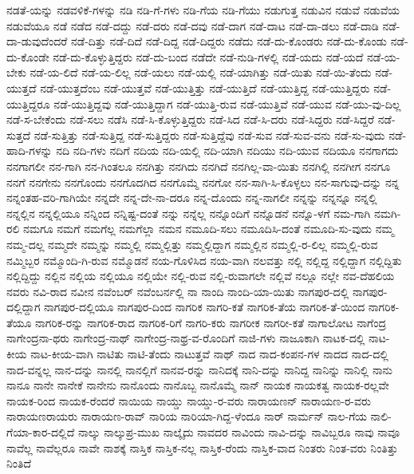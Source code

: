 {ನಡತೆ-ಯನ್ನು
ನಡವಳಿಕೆ-ಗಳನ್ನು
ನಡಿ
ನಡಿ-ಗೆ-ಗಳು
ನಡಿ-ಗೆಯ
ನಡಿ-ಗೆಯು
ನಡುಗುತ್ತ
ನಡುವಿನ
ನಡುವೆ
ನಡುವೆಯ
ನಡುವೆಯೂ
ನಡೆ
ನಡೆದ
ನಡೆ-ದದ್ದು
ನಡೆ-ದರು
ನಡೆ-ದವು
ನಡೆ-ದಾಗ
ನಡೆ-ದಾಟ
ನಡೆ-ದಾ-ಡಲು
ನಡೆ-ದಾಡಿ
ನಡೆ-ದಾ-ಡುವುದೆಂದರೆ
ನಡೆ-ದಿತ್ತು
ನಡೆ-ದಿದೆ
ನಡೆ-ದಿದ್ದ
ನಡೆ-ದಿದ್ದರು
ನಡೆದು
ನಡೆ-ದು-ಕೊಂಡರು
ನಡೆ-ದು-ಕೊಂಡು
ನಡೆ-ದು-ಕೊಂಡೇ
ನಡೆ-ದು-ಕೊಳ್ಳುತ್ತಿದ್ದರು
ನಡೆ-ದು-ಬಂದ
ನಡೆದೇ
ನಡೆ-ನುಡಿ-ಗಳಲ್ಲಿ
ನಡೆ-ಯದು
ನಡೆ-ಯದೆ
ನಡೆ-ಯ-ಬೇಕು
ನಡೆ-ಯ-ಲಿದೆ
ನಡೆ-ಯ-ಲಿಲ್ಲ
ನಡೆ-ಯಲು
ನಡೆ-ಯಲ್ಲಿ
ನಡೆ-ಯಾಗಿತ್ತು
ನಡೆ-ಯಿತು
ನಡೆ-ಯಿ-ತೆಂದು
ನಡೆ-ಯುತ್ತದೆ
ನಡೆ-ಯುತ್ತದೆಂಬ
ನಡೆ-ಯುತ್ತವೆ
ನಡೆ-ಯುತ್ತಿತ್ತು
ನಡೆ-ಯುತ್ತಿದೆ
ನಡೆ-ಯುತ್ತಿದ್ದ
ನಡೆ-ಯುತ್ತಿದ್ದರು
ನಡೆ-ಯುತ್ತಿದ್ದರೂ
ನಡೆ-ಯುತ್ತಿದ್ದವು
ನಡೆ-ಯುತ್ತಿದ್ದಾಗ
ನಡೆ-ಯುತ್ತಿ-ರುವ
ನಡೆ-ಯುತ್ತಿವೆ
ನಡೆ-ಯುವ
ನಡೆ-ಯು-ವು-ದಿಲ್ಲ
ನಡೆ-ಸ-ಬೇಕೆಂದು
ನಡೆ-ಸಲು
ನಡೆಸಿ
ನಡೆ-ಸಿ-ಕೊಳ್ಳುತ್ತಿದ್ದರು
ನಡೆ-ಸಿದ
ನಡೆ-ಸಿ-ದರು
ನಡೆ-ಸಿದ್ದರು
ನಡೆ-ಸಿದ್ದರೆ
ನಡೆ-ಸುತ್ತದೆ
ನಡೆ-ಸುತ್ತಿತ್ತು
ನಡೆ-ಸುತ್ತಿದ್ದ
ನಡೆ-ಸುತ್ತಿದ್ದರು
ನಡೆ-ಸುತ್ತಿದ್ದೆವು
ನಡೆ-ಸುವ
ನಡೆ-ಸುವ-ವನು
ನಡೆ-ಸು-ವುದು
ನಡೆ-ಹಾದಿ-ಗಳನ್ನು
ನದಿ
ನದಿ-ಗಳು
ನದಿಗೆ
ನದಿಯ
ನದಿ-ಯಲ್ಲಿ
ನದಿ-ಯಾಗಿ
ನದಿಯು
ನದಿ-ಯುವ
ನದಿಯೂ
ನನಗಾಗದು
ನನಗಾಗಲೀ
ನನ-ಗಾಗಿ
ನನ-ಗಿಂತಲೂ
ನನಗಿತ್ತು
ನನಗಿದು
ನನಗಿದೆ
ನನಗಿಲ್ಲ-ವಾ-ಯಿತು
ನನಗಿಲ್ಲಿ
ನನಗೀಗ
ನನಗೂ
ನನಗೆ
ನನಗೇನು
ನನಗೊಂದು
ನನಗೊದಗಿದ
ನನಗೊಮ್ಮೆ
ನನಗೋ
ನನ-ಸಾಗಿ-ಸಿ-ಕೊಳ್ಳಲು
ನನ-ಸಾಗುವು-ದನ್ನು
ನನ್ನ
ನನ್ನಂತಹ-ವರಿ-ಗಾಗಿಯೇ
ನನ್ನದೇ
ನನ್ನ-ದೇ-ನಾ-ದರೂ
ನನ್ನ-ದೊಂದು
ನನ್ನ-ನಾಗಲೀ
ನನ್ನನ್ನು
ನನ್ನನ್ನೂ
ನನ್ನಲ್ಲಿ
ನನ್ನಲ್ಲಿನ
ನನ್ನಲ್ಲಿಯೂ
ನನ್ನಿಂದ
ನನ್ನಿಷ್ಟ-ದಂತೆ
ನನ್ನು
ನನ್ನೆಲ್ಲ
ನನ್ನೊಂದಿಗೆ
ನನ್ನೊಡನೆ
ನನ್ನೊ-ಳಗೆ
ನಮ-ಗಾಗಿ
ನಮಗಿ-ರಲಿ
ನಮಗೂ
ನಮಗೆ
ನಮಗೆಲ್ಲ
ನಮಗೆಲ್ಲಾ
ನಮನ
ನಮೂದಿ-ಸಲು
ನಮೂದಿಸಿ-ದಂತೆ
ನಮೂದಿ-ಸು-ವುದು
ನಮ್ಮ
ನಮ್ಮ-ದಲ್ಲ
ನಮ್ಮದೇ
ನಮ್ಮನ್ನು
ನಮ್ಮಲ್ಲಿ
ನಮ್ಮಲ್ಲಿತ್ತು
ನಮ್ಮಲ್ಲಿದ್ದಾಗ
ನಮ್ಮಲ್ಲಿನ
ನಮ್ಮಲ್ಲಿ-ರ-ಲಿಲ್ಲ
ನಮ್ಮಲ್ಲಿ-ರುವ
ನಮ್ಮಿಬ್ಬರ
ನಮ್ಮೊಂದಿ-ಗಿ-ರುವ
ನಮ್ಮೊಡನೆ
ನಯ-ಗೊಳಿಸಿದ
ನಯ-ವಾಗಿ
ನಲವತ್ತು
ನಲ್ಲಿ
ನಲ್ಲಿದ್ದ
ನಲ್ಲಿದ್ದಾಗ
ನಲ್ಲಿದ್ದಿತು
ನಲ್ಲಿದ್ದಿದ್ದು
ನಲ್ಲಿನ
ನಲ್ಲಿಯ
ನಲ್ಲಿಯೂ
ನಲ್ಲಿಯೇ
ನಲ್ಲಿ-ರುವ
ನಲ್ಲಿ-ರುವಾಗಲೇ
ನಲ್ಲಿವೆ
ನಲ್ಲೂ
ನಲ್ಲೇ
ನವ-ದೆಹಲಿಯ
ನವರು
ನವಿ-ರಾದ
ನವೀನ
ನವೆಂಬರ್
ನವೆಂಬರ್ನಲ್ಲಿ
ನಾ
ನಾಂದಿ
ನಾಂದಿ-ಯಾ-ಯಿತು
ನಾಗಪುರ-ದಲ್ಲಿ
ನಾಗಪುರ-ದಲ್ಲಿದ್ದಾಗ
ನಾಗಪುರ-ದಲ್ಲಿಯೂ
ನಾಗಪುರ-ದಿಂದ
ನಾಗರಿಕ
ನಾಗರಿ-ಕತೆ
ನಾಗರಿಕ-ತೆಯ
ನಾಗರಿಕ-ತೆ-ಯಿಂದ
ನಾಗರಿಕ-ತೆಯೂ
ನಾಗರಿಕ-ರನ್ನು
ನಾಗರಿಕ-ರಾದ
ನಾಗರಿಕ-ರಿಗೆ
ನಾಗರಿ-ಕರು
ನಾಗರೀಕ
ನಾಗರೀ-ಕತೆ
ನಾಗಾಲೋಟ
ನಾಗೆಂದ್ರ
ನಾಗೇಂದ್ರನಾ-ಥರು
ನಾಗೇಂದ್ರ-ನಾಥ್
ನಾಗೇಂದ್ರ-ನಾಥ್ರ-ವ-ರೊಂದಿಗೆ
ನಾಜಿ-ಗಳು
ನಾಜೂಕಾಗಿ
ನಾಟಕ-ದಲ್ಲಿ
ನಾಟ-ಕೀಯ
ನಾಟ-ಕೀಯ-ವಾಗಿ
ನಾಟಿತು
ನಾಟಿ-ತೆಂದು
ನಾಟುತ್ತವೆ
ನಾಥ್
ನಾದ
ನಾದ-ಕಂಪನ-ಗಳ
ನಾದದ
ನಾದ-ದಲ್ಲಿ
ನಾದ-ವನ್ನಲ್ಲ
ನಾನ-ದನ್ನು
ನಾನಲ್ಲಿ
ನಾನಲ್ಲಿಗೆ
ನಾನವ-ರನ್ನು
ನಾನಿದಕ್ಕೆ
ನಾನಿ-ದನ್ನು
ನಾನಿದ್ದ
ನಾನಿನ್ನು
ನಾನಿಲ್ಲಿ
ನಾನು
ನಾನೂ
ನಾನೇ
ನಾನೇಕೆ
ನಾನೇನು
ನಾನೊಂದು
ನಾನೊಬ್ಬ
ನಾನೊಮ್ಮೆ
ನಾನ್
ನಾಯಕ
ನಾಯಕತ್ವ
ನಾಯಕ-ರಲ್ಲವೇ
ನಾಯಕ-ರಿಂದ
ನಾಯಕ-ರೆಂದರೆ
ನಾಯಿಯ
ನಾಯ್ಡು
ನಾಯ್ಡು-ರ-ವರು
ನಾರಾಯಣನ್
ನಾರಾಯಣ-ರ-ವರು
ನಾರಾಯಣರಾಯರು
ನಾರಾಯಣ-ರಾವ್
ನಾರಿಯ
ನಾರಿಯಾ-ಗಿದ್ದ-ಳೆಂದೂ
ನಾರ್
ನಾರ್ಮನ್
ನಾಲ-ಗೆಯ
ನಾಲಿ-ಗೆಯಾ-ಕಾರ-ದಲ್ಲಿದೆ
ನಾಲ್ಕು
ನಾಲ್ಕುಪ್ರ-ಮುಖ
ನಾಲ್ಕೈದು
ನಾವದರ
ನಾವಿಂದು
ನಾವಿ-ದನ್ನು
ನಾವಿಬ್ಬರೂ
ನಾವು
ನಾವೂ
ನಾವೆಲ್ಲ
ನಾವೆಲ್ಲರೂ
ನಾವೇ
ನಾಶಕ್ಕೆ
ನಾಸ್ತಿಕ
ನಾಸ್ತಿಕ-ನಲ್ಲ
ನಾಸ್ತಿಕ-ರೆಂದು
ನಾಸ್ತಿಕ-ವಾದ
ನಿಂತರು
ನಿಂತ-ವರು
ನಿಂತಿತ್ತು
ನಿಂತಿದೆ
}
